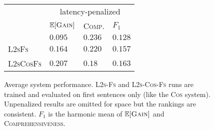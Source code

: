 \begin{figure}
  \center
  \begin{tabular}{ l | l l l |}
    &\multicolumn{3}{c}{latency-penalized}\\
    & $\mathbb{E}[\textsc{Gain}]$     & \textsc{Comp.} & $F_1$ \\
    \hline
    \small \modelCos{}  & $0.095$ & $\mathbf{0.236}$ & $0.128$ \\
    \small \textsc{L2sFs}  & $0.164$ & $0.220$ & $0.157$ \\
    \small \textsc{L2sCosFs} & 
      $\mathbf{0.207}$ & $0.18~~$ & $\mathbf{0.163}$ \\
  \end{tabular}
  \caption{Average system performance. \textsc{L2s-Fs} and \textsc{L2s-Cos-Fs} 
           runs are trained and evaluated on first sentences only (like the 
           \textsc{Cos} system). Unpenalized results are omitted for space but
           the rankings are consistent. $F_1$ is the harmonic mean of 
          $\mathbb{E}[\textsc{Gain}]$ and \textsc{Comprehensiveness}.}
  \label{fig:lsfsresults}
\end{figure}


